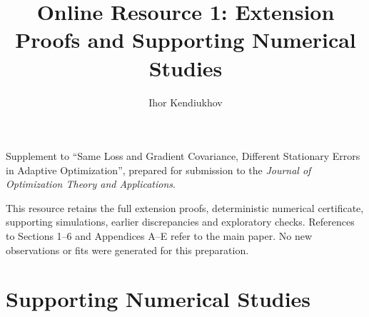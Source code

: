 

\title{Online Resource 1: Extension Proofs and Supporting Numerical Studies}
\author{Ihor Kendiukhov}
\date{}
\maketitle
\noindent Supplement to ``Same Loss and Gradient Covariance, Different Stationary
Errors in Adaptive Optimization'', prepared for submission to the
\emph{Journal of Optimization Theory and Applications}.

\noindent This resource retains the full extension proofs, deterministic numerical
certificate, supporting simulations, earlier discrepancies and exploratory
checks. References to Sections 1--6 and Appendices A--E refer to the main
paper. No new observations or fits were generated for this preparation.
\renewcommand{\thefigure}{S\arabic{figure}}
\setcounter{figure}{0}
\renewcommand{\thetable}{S\arabic{table}}
\setcounter{table}{0}
\renewcommand{\thesection}{S\arabic{section}}
\setcounter{section}{0}

\appendix
\setcounter{section}{5}



\section{Supporting Numerical Studies}\label{app:supporting-studies}

\FloatBarrier

